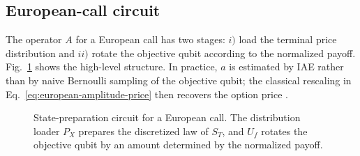 \documentclass[12pt]{article}
\begin{document}
\subsection{European-call circuit}

The operator $A$ for a European call has two stages: $i)$ load the terminal price distribution and $ii)$ rotate the objective qubit according to the normalized payoff.  Fig.~\ref{fig:a-operator-circuit} shows the high-level structure.  In practice, $a$ is estimated by IAE rather than by naive Bernoulli sampling of the objective qubit; the classical rescaling in Eq.~\eqref{eq:european-amplitude-price} then recovers the option price \cite{grinkoIterativeQuantumAmplitude2021,stamatopoulosOptionPricingUsing2020}.

\begin{figure}[H]
    \centering
    \caption{State-preparation circuit for a European call.  The distribution loader $P_X$ prepares the discretized law of $S_T$, and $U_f$ rotates the objective qubit by an amount determined by the normalized payoff.}
    \label{fig:a-operator-circuit}
\end{figure}
\end{document}

